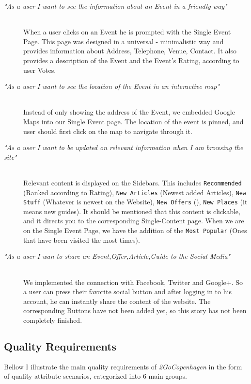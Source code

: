 \begin{description}
  \item[\emph{"As a user I want to see the information about an Event in a friendly way"}] \hfill \\ 
  When a user clicks on an Event he is prompted with the Single Event Page. This page was designed in a universal - minimalistic way and provides information about Address, Telephone, Venue, Contact. It also provides a description of the Event and the Event's Rating, according to user Votes.
  
  \item[\emph{"As a user I want to see the location of the Event in an interactive map"}] \hfill \\
  Instead of only showing the address of the Event, we embedded Google Maps into our Single Event page. The location of the event is pinned, and user should first click on the map to navigate through it.
  
  \item[\emph{"As a user I want to be updated on relevant information when I am browsing the site"}] \hfill \\
  Relevant content is displayed on the Sidebars. This includes \verb|Recommended| (Ranked according to Rating), \verb|New Articles| (Newest added Articles), \verb|New Stuff| (Whatever is newest on the Website), \verb|New Offers| (), \verb|New Places| (it means new guides). It should be mentioned that this content is clickable, and it directs you to the corresponding Single-Content page. When we are on the Single Event Page, we have the addition of the \verb|Most Popular| (Ones that have been visited the most times). 
  
  \item[\emph{"As a user I wan to share an Event,Offer,Article,Guide to the Social Media"}]\hfill \\
  We implemented the connection with Facebook, Twitter and Google+. So a user can press their favorite social button and after logging in to his account, he can instantly share the content of the website. The corresponding Buttons have not been added yet, so this story has not been completely finished.
\end{description}




\subsection{Quality Requirements}

Bellow I illustrate the main quality requirements of \emph{2GoCopenhagen} in the form of quality attribute scenarios, categorized into 6 main groups. 

